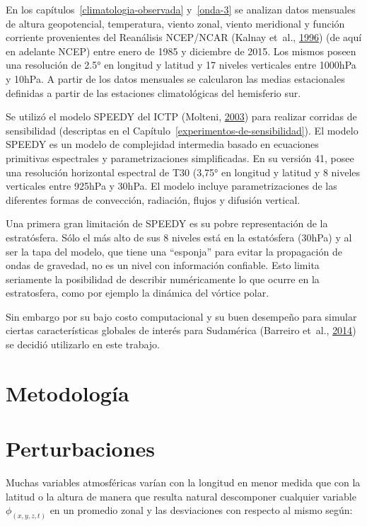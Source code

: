 \documentclass[spanish,a4paper,12pt,oneside]{book}
\begin{document}
En los capítulos~\ref{climatologia-observada} y~\ref{onda-3} se analizan
datos mensuales de altura geopotencial, temperatura, viento zonal,
viento meridional y función corriente provenientes del Reanálisis
NCEP/NCAR (Kalnay et~al., \protect\hyperlink{ref-Kalnay1996}{1996}) (de
aquí en adelante NCEP) entre enero de 1985 y diciembre de 2015. Los
mismos poseen una resolución de 2.5° en longitud y latitud y 17 niveles
verticales entre 1000hPa y 10hPa. A partir de los datos mensuales se
calcularon las medias estacionales definidas a partir de las estaciones
climatológicas del hemisferio sur.

Se utilizó el modelo SPEEDY del ICTP (Molteni,
\protect\hyperlink{ref-Molteni2003}{2003}) para realizar corridas de
sensibilidad (descriptas en el
Capítulo~\ref{experimentos-de-sensibilidad}). El modelo SPEEDY es un
modelo de complejidad intermedia basado en ecuaciones primitivas
espectrales y parametrizaciones simplificadas. En su versión 41, posee
una resolución horizontal espectral de T30 (3,75° en longitud y latitud
y 8 niveles verticales entre 925hPa y 30hPa. El modelo incluye
parametrizaciones de las diferentes formas de convección, radiación,
flujos y difusión vertical.

Una primera gran limitación de SPEEDY es su pobre representación de la
estratósfera. Sólo el más alto de sus 8 niveles está en la estatósfera
(30hPa) y al ser la tapa del modelo, que tiene una ``esponja'' para
evitar la propagación de ondas de gravedad, no es un nivel con
información confiable. Esto limita seriamente la posibilidad de
describir numéricamente lo que ocurre en la estratosfera, como por
ejemplo la dinámica del vórtice polar.

Sin embargo por su bajo costo computacional y su buen desempeño para
simular ciertas características globales de interés para Sudamérica
(Barreiro et~al., \protect\hyperlink{ref-Barreiro2014}{2014}) se decidió
utilizarlo en este trabajo.

\section{Metodología}\label{metodologia}

\section*{Perturbaciones}

Muchas variables atmosféricas varían con la longitud en menor medida que
con la latitud o la altura de manera que resulta natural descomponer
cualquier variable \(\phi_{(x, y, z, t)}\) en un promedio zonal y las
desviaciones con respecto al mismo según:
\end{document}
